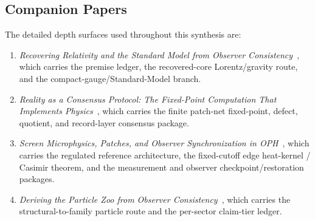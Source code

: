 \documentclass[11pt]{article}
\begin{document}
\subsection*{Companion Papers}

The detailed depth surfaces used throughout this synthesis are:
\begin{enumerate}[leftmargin=2em]
\item \emph{Recovering Relativity and the Standard Model from Observer Consistency}~\cite{ophcompact}, which carries the premise ledger, the recovered-core Lorentz/gravity route, and the compact-gauge/Standard-Model branch.
\item \emph{Reality as a Consensus Protocol: The Fixed-Point Computation That Implements Physics}~\cite{ophconsensus}, which carries the finite patch-net fixed-point, defect, quotient, and record-layer consensus package.
\item \emph{Screen Microphysics, Patches, and Observer Synchronization in OPH}~\cite{ophmicrophysics}, which carries the regulated reference architecture, the fixed-cutoff edge heat-kernel / Casimir theorem, and the measurement and observer checkpoint/restoration packages.
\item \emph{Deriving the Particle Zoo from Observer Consistency}~\cite{ophparticles}, which carries the structural-to-family particle route and the per-sector claim-tier ledger.
\end{enumerate}

\def\OPHSkipEmbeddedReferences{1}



\appendix


\end{document}
